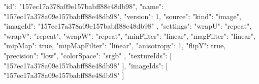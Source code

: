 {
  "id": "157ec17a378a09e157babff88e48db98",
  "name": "157ec17a378a09e157babff88e48db98",
  "version": 1,
  "source": {
    "kind": "image",
    "imageId": "157ec17a378a09e157babff88e48db98"
  },
  "settings": {
    "wrapU": "repeat",
    "wrapV": "repeat",
    "wrapW": "repeat",
    "minFilter": "linear",
    "magFilter": "linear",
    "mipMap": true,
    "mipMapFilter": "linear",
    "anisotropy": 1,
    "flipY": true,
    "precision": "low",
    "colorSpace": "srgb"
  },
  "textureIds": [
    "157ec17a378a09e157babff88e48db98"
  ],
  "imageIds": [
    "157ec17a378a09e157babff88e48db98"
  ]
}
